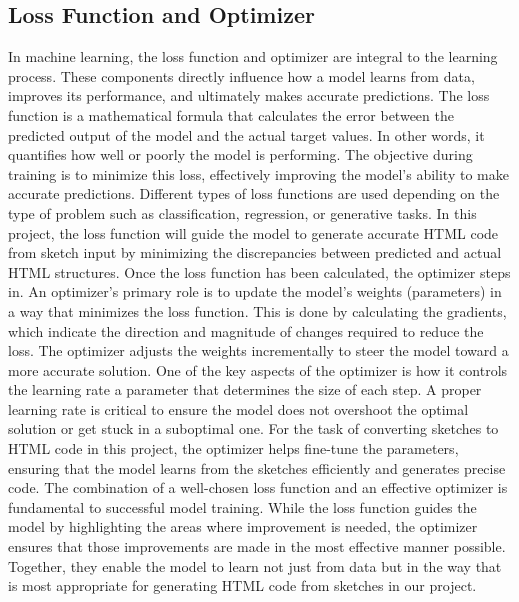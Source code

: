 \subsection{Loss Function and Optimizer}
In machine learning, the loss function and optimizer are integral to the learning process. These components directly influence how a model learns from data, improves its performance, and ultimately makes accurate predictions. The loss function is a mathematical formula that calculates the error between the predicted output of the model and the actual target values. In other words, it quantifies how well or poorly the model is performing. The objective during training is to minimize this loss, effectively improving the model's ability to make accurate predictions. Different types of loss functions are used depending on the type of problem such as classification, regression, or generative tasks. In this project, the loss function will guide the model to generate accurate HTML code from sketch input by minimizing the discrepancies between predicted and actual HTML structures.
Once the loss function has been calculated, the optimizer steps in. An optimizer’s primary role is to update the model’s weights (parameters) in a way that minimizes the loss function. This is done by calculating the gradients, which indicate the direction and magnitude of changes required to reduce the loss. The optimizer adjusts the weights incrementally to steer the model toward a more accurate solution. One of the key aspects of the optimizer is how it controls the learning rate a parameter that determines the size of each step. A proper learning rate is critical to ensure the model does not overshoot the optimal solution or get stuck in a suboptimal one. For the task of converting sketches to HTML code in this project, the optimizer helps fine-tune the parameters, ensuring that the model learns from the sketches efficiently and generates precise code.
The combination of a well-chosen loss function and an effective optimizer is fundamental to successful model training. While the loss function guides the model by highlighting the areas where improvement is needed, the optimizer ensures that those improvements are made in the most effective manner possible. Together, they enable the model to learn not just from data but in the way that is most appropriate for generating HTML code from sketches in our project.
